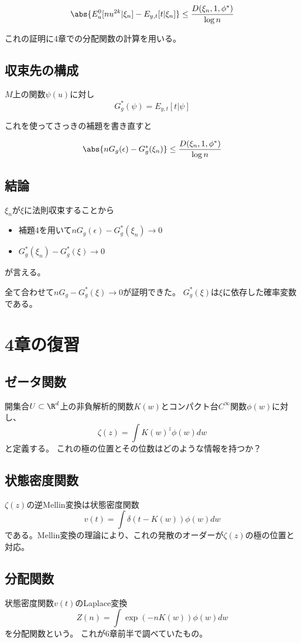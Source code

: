 \documentclass[uplatex, slide, papersize]{jsarticle}
\begin{document}
\begin{lem}[Lemma 6.6, $p=1, f=1, \xi=\xi_n$]
\[
\abs{E^0_u[nu^{2k}\vert\xi_n]-E_{y,t}[t\vert\xi_n]}\leq\frac{D(\xi_n,1,\phi^*)}{\log n}
\]
\end{lem}
これの証明に4章での分配関数の計算を用いる。

\newpage
\subsection*{収束先の構成}
\begin{dfn}[6.46]
$M$上の関数$\psi(u)$に対し
\[
G_g^*(\psi)=E_{y,t}[t\vert\psi]
\]
\end{dfn}

これを使ってさっきの補題を書き直すと
\begin{lem}
\[
\abs{nG_g(\epsilon)-G_g^*(\xi_n)}\leq\frac{D(\xi_n,1,\phi^*)}{\log n}
\]
\end{lem}

\subsection*{結論}
$\xi_n$が$\xi$に法則収束することから
\begin{itemize}
\item 補題4を用いて$nG_g(\epsilon)-G_g^*(\xi_n)\to 0$
\item $G_g^*(\xi_n)-G^*_g(\xi)\to 0$
\end{itemize}
が言える。

全て合わせて$nG_g-G^*_g(\xi)\to0$が証明できた。
$G^*_g(\xi)$は$\xi$に依存した確率変数である。

\newpage
\section*{4章の復習}
\subsection*{ゼータ関数}
開集合$U\subset \R^d$上の非負解析的関数$K(w)$とコンパクト台$C^\infty$関数$\phi(w)$に対し、
\[
\zeta(z)=\int K(w)^z\phi(w)dw
\]
と定義する。
これの極の位置とその位数はどのような情報を持つか？
\newpage
\subsection*{状態密度関数}
$\zeta(z)$の逆Mellin変換は状態密度関数
\[
v(t)=\int\delta(t-K(w))\phi(w)dw
\]
である。Mellin変換の理論により、これの発散のオーダーが$\zeta(z)$の極の位置と対応。
\newpage
\subsection*{分配関数}
状態密度関数$v(t)$のLaplace変換
\[
Z(n)=\int\exp(-nK(w))\phi(w)dw
\]
を分配関数という。
これが6章前半で調べていたもの。
\newpage
\end{document}
